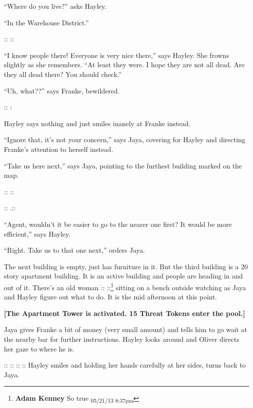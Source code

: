 ``Where do you live?'' asks Hayley.

``In the Warehouse District.''

::  ::

``I know people there!  Everyone is very nice there,'' says Hayley.  She frowns slightly as she remembers.  ``At least they were.  I hope they are not all dead.  Are they all dead there?  You should check.''

``Uh, what??'' says Franke, bewildered.

::  :

Hayley says nothing and just smiles inanely at Franke instead.

``Ignore that, it's not your concern,'' says Jaya, covering for Hayley and directing Franke's attention to herself instead.

``Take us here next,'' says Jaya, pointing to the furthest building marked on the map.

::  ::

::  .::

``Agent, wouldn't it be easier to go to the nearer one first?  It would be more efficient,'' says Hayley.

``Right.  Take us to that one next,'' orders Jaya.



The next building is empty, just has furniture in it.  But the third building is a 20 story apartment building.  It is an active building and people are heading in and out of it.  There's an old woman ::  ::\footnote{\textbf{Adam Kenney }So true \textsubscript{05/21/13 8:37pm}} sitting on a bench outside watching as Jaya and Hayley figure out what to do.    It is the mid afternoon at this point.  



\textbf{{[}The Apartment Tower is activated.  15 Threat Tokens enter the pool.{]}}



Jaya gives Franke a bit of money (very small amount) and tells him to go wait at the nearby bar for further instructions.  Hayley looks around and Oliver directs her gaze to where he is.  

::  ::  ::  ::  Hayley smiles and holding her hands carefully at her sides, turns back to Jaya.



